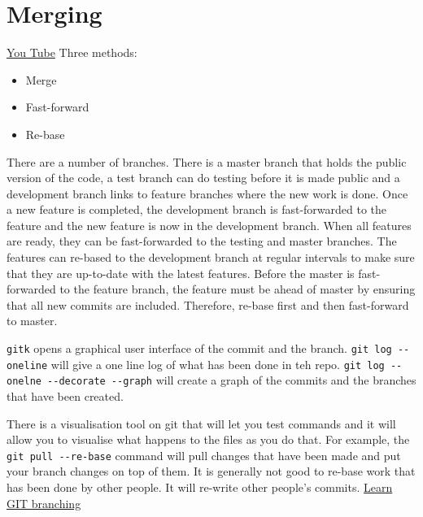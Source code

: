 \documentclass[11pt]{article} %
\begin{document}
\section{Merging}
\href{https://www.youtube.com/watch?v=to6tIdy5rNc&feature=em-subs_digest-wl}{You Tube}
Three methods:
\begin{itemize}
\item Merge
\item Fast-forward
\item Re-base
\end{itemize}

There are a number of branches. There is a master branch that holds the public version of the code, a test branch can do testing before it is made public and a development branch links to feature branches where the new work is done.  Once a new feature is completed, the development branch is fast-forwarded to the feature and the new feature is now in the development branch.  When all features are ready, they can be fast-forwarded to the testing and master branches.  The features can re-based to the development branch at regular intervals to make sure
that they are up-to-date with the latest features. Before the master is fast-forwarded to the feature branch, the feature must be ahead of master by ensuring that all new commits are included. Therefore, re-base first and then fast-forward to master. 

\lstinline{gitk} opens a graphical user interface of the commit and the branch.  \lstinline{git log --oneline} will give a one line log of what has been done in teh repo. \lstinline{git log --onelne --decorate --graph} will create a graph of the commits and the branches that have been created. 

There is a visualisation tool on git that will let you test commands and it will allow you to visualise what happens to the files as you do that.   For example, the \lstinline{git pull --re-base} command will pull changes that have been made and put your branch changes on top of them. It is generally not good to re-base work that has been done by other people.  It will re-write other people's commits. \href{http://pcottle.github.io/learnGitBranching/}{Learn GIT branching}
\end{document}
